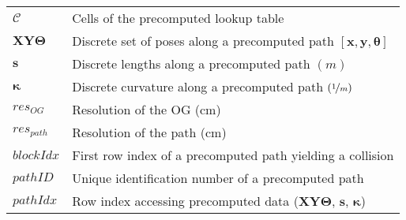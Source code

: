 \documentclass[twoside,english,master=wtk,inputenc="utf8"]{kulemt}
\newcommand{\nf}{\nicefrac}
\begin{document}
\begin{flushleft}
\begin{tabularx}{\textwidth}{@{}p{16mm}X@{}}
$\mathcal{C}$ 		& Cells of the precomputed lookup table\\
$\bm{XY\Theta}$ 	& Discrete set of poses along a precomputed path $[\bm{x},\bm{y},\bm{\theta}]$ \\
$\bm{s}$ 				& Discrete lengths along a precomputed path  $(m)$ \\
$\bm{\kappa}$ 		& Discrete curvature along a precomputed path $(\nf{1}{m})$   \\
$res_{OG}$			& Resolution of the OG (cm)\\ 
$res_{path}$			& Resolution of the path (cm)\\ 
$blockIdx$ 				& First row index of a precomputed path yielding a collision   \\
$pathID$  				& Unique identification number of a precomputed path \\
$pathIdx$ 				&	Row index accessing precomputed data ($\bm{XY\Theta}$, $\bm{s}$, $\bm{\kappa}$)
\end{tabularx}
\end{flushleft}

\mainmatter






\appendixpage*
\appendix



\backmatter


\end{document}

